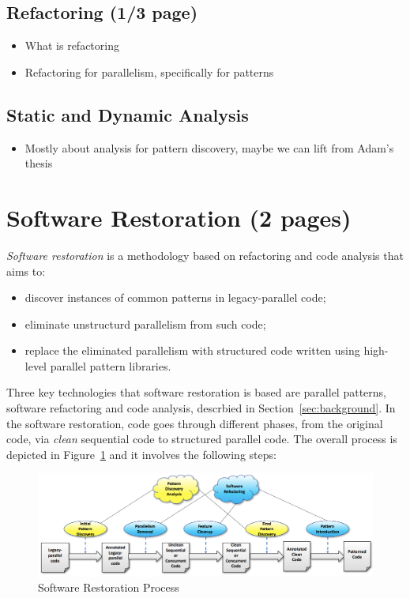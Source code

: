 \documentclass{llncs}
\begin{document}
\subsection{Refactoring (1/3 page)}
\begin{itemize}
\item What is refactoring
\item Refactoring for parallelism, specifically for patterns
\end{itemize}

\subsection{Static and Dynamic Analysis}
\begin{itemize}
\item Mostly about analysis for pattern discovery, maybe we can lift from Adam's thesis
\end{itemize}


\section{Software Restoration (2 pages)} \label{sec:softRest}

\noindent
\emph{Software restoration} is a methodology based on refactoring and code analysis that aims to:
\begin{itemize}
\item discover instances of common patterns in legacy-parallel code;
\item eliminate unstructurd parallelism from such code;
  \item replace the eliminated parallelism with structured code written using high-level parallel pattern libraries.
\end{itemize}
Three key technologies that software restoration is based are parallel patterns, software refactoring and code analysis, descrbied in Section~\ref{sec:background}. In the software restoration, code goes through different phases, from the original code, via \emph{clean} sequential code to structured parallel code. The overall process is depicted in Figure~\ref{fig:SoftRest} and it involves the following steps: 

\begin{figure}
  \begin{center}
\includegraphics[scale=0.2]{images/SoftRest.png}
\caption{Software Restoration Process}
\label{fig:SoftRest}
  \end{center}
\end {figure}
\end{document}
